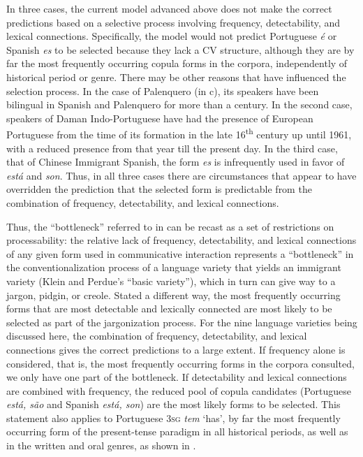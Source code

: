 \documentclass[output=paper,colorlinks,citecolor=brown]{langscibook}
\begin{document}
In three cases, the current model advanced above does not make the correct predictions based on a selective process involving frequency, detectability, and lexical connections. Specifically, the model would not predict Portuguese \textit{é} or Spanish\textit{ es} to be selected because they lack a CV structure, although they are by far the most frequently occurring copula forms in the corpora, independently of historical period or genre. There may be other reasons that have influenced the selection process. In the case of Palenquero (in c), its speakers have been bilingual in Spanish and Palenquero for more than a century. In the second case, speakers of Daman Indo-Portuguese have had the presence of European Portuguese from the time of its formation in the late 16\textsuperscript{th} century up until 1961, with a reduced presence from that year till the present day. In the third case, that of Chinese Immigrant Spanish, the form \textit{es} is infrequently used in favor of \textit{está} and \textit{son}. Thus, in all three cases there are circumstances that appear to have overridden the prediction that the selected form is predictable from the combination of frequency, detectability, and lexical connections.


Thus, the “bottleneck” referred to in  \citet{Good2012} can be recast as a set of restrictions on processability: the relative lack of frequency, detectability, and lexical connections of any given form used in communicative interaction represents a “bottleneck” in the conventionalization process of a language variety that yields an immigrant variety (Klein and Perdue's “basic variety”), which in turn can give way to a jargon, pidgin, or creole. Stated a different way, the most frequently occurring forms that are most detectable and lexically connected are most likely to be selected as part of the jargonization process. For the nine language varieties being discussed here, the combination of frequency, detectability, and lexical connections gives the correct predictions to a large extent. If frequency alone is considered, that is, the most frequently occurring forms in the corpora consulted, we only have one part of the bottleneck. If detectability and lexical connections are combined with frequency, the reduced pool of copula candidates (Portuguese \textit{está, são} and Spanish \textit{está, son}) are the  most likely forms to be selected. This statement also applies to Portuguese 3\textsc{sg} \textit{tem} `has', by far the most frequently occurring form of the present-tense paradigm in all historical periods, as well as in the written and oral genres, as shown in . 
\end{document}
